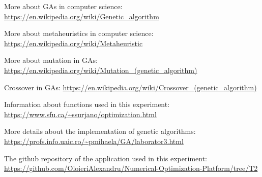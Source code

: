 \documentclass[a4paper]{article}
\begin{document}
	\begin{thebibliography}{9}
		
		More about GAs in computer science:
		\url{https://en.wikipedia.org/wiki/Genetic_algorithm}
		
		More about metaheuristics in computer science:
		\url{https://en.wikipedia.org/wiki/Metaheuristic}
		
		More about mutation in GAs:
		\url{https://en.wikipedia.org/wiki/Mutation_(genetic_algorithm)}
		
		Crossover in GAs:
		\url{https://en.wikipedia.org/wiki/Crossover_(genetic_algorithm)}
		
		Information about functions used in this experiment:
		\url{https://www.sfu.ca/~ssurjano/optimization.html}
		
		More details about the implementation of genetic algorithms:
		\url{https://profs.info.uaic.ro/~pmihaela/GA/laborator3.html}
		
		The github repository of the application used in this experiment:
		\url{https://github.com/OloieriAlexandru/Numerical-Optimization-Platform/tree/T2}
		
	\end{thebibliography}
	
\end{document}
